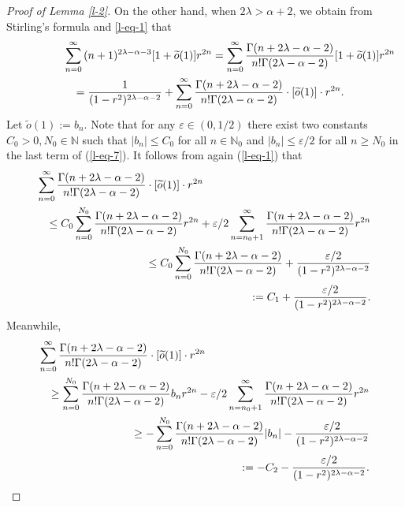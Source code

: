 \documentclass[10pt]{amsart}
\theoremstyle{definition}    %
\numberwithin{equation}{section}
\begin{document}
\begin{proof}[Proof of Lemma \ref{l-2}]
On the other hand, when $2\lambda>\alpha+2$, we obtain from Stirling's formula and \ref{l-eq-1} that 
  \begin{eqnarray}\label{l-eq-7}
 \lefteqn{\sum_{n=0}^{\infty}{(n+1)^{2\lambda-\alpha-3}}[1+\widetilde{o}(1)]r^{2n}=\sum_{n=0}^{\infty}\frac{\Gamma(n+2\lambda-\alpha-2)}{n!\Gamma(2\lambda-\alpha-2)}[1+\widetilde{o}(1)]r^{2n}}\nonumber \\
 &&=\frac{1}{{(1-r^2)^{2\lambda-\alpha-2}}}+\sum_{n=0}^{\infty}\frac{\Gamma(n+2\lambda-\alpha-2)}{n!\Gamma(2\lambda-\alpha-2)}\cdot [\widetilde{o}(1)]\cdot r^{2n}. 
 \end{eqnarray}
Let $\widetilde{o}(1):=b_n$. Note that for any $\varepsilon\in (0,1/2)$ there exist two constants $C_0>0, N_0\in \mathbb{N}$ such that $|b_n|\leq C_0$ for all $n\in \mathbb{N}_0$ and $|b_n|\leq \varepsilon/2$ for all $n\geq N_0$ in the last term of (\ref{l-eq-7}). 
It follows from again  (\ref{l-eq-1}) that
\begin{eqnarray}\label{l-eq-8}
\lefteqn{\sum_{n=0}^{\infty}\frac{\Gamma(n+2\lambda-\alpha-2)}{n!\Gamma(2\lambda-\alpha-2)}\cdot [\widetilde{o}(1)]\cdot r^{2n}} \nonumber \\
  && \leq C_0\sum_{n=0}^{N_0} \frac{\Gamma(n+2\lambda-\alpha-2)}{n!\Gamma(2\lambda-\alpha-2)}r^{2n}+\varepsilon/2\sum_{n={{n_0}+1}}^{\infty}\frac{\Gamma(n+2\lambda-\alpha-2)}{n!\Gamma(2\lambda-\alpha-2)}r^{2n} \nonumber \\
  && \leq C_0\sum_{n=0}^{N_0} \frac{\Gamma(n+2\lambda-\alpha-2)}{n!\Gamma(2\lambda-\alpha-2)}+\frac{\varepsilon/2}{{(1-r^2)^{2\lambda-\alpha-2}}}\nonumber \\
  &&:=C_1+\frac{\varepsilon/2}{{(1-r^2)^{2\lambda-\alpha-2}}}.
  \end{eqnarray}
Meanwhile, \begin{eqnarray}\label{l-eq-9}
\lefteqn{\sum_{n=0}^{\infty}\frac{\Gamma(n+2\lambda-\alpha-2)}{n!\Gamma(2\lambda-\alpha-2)}\cdot [\widetilde{o}(1)]\cdot r^{2n}} \nonumber \\
  && \geq \sum_{n=0}^{N_0} \frac{\Gamma(n+2\lambda-\alpha-2)}{n!\Gamma(2\lambda-\alpha-2)}b_n r^{2n}-\varepsilon/2\sum_{n={{n_0}+1}}^{\infty}\frac{\Gamma(n+2\lambda-\alpha-2)}{n!\Gamma(2\lambda-\alpha-2)}r^{2n} \nonumber \\
  && \geq -\sum_{n=0}^{N_0} \frac{\Gamma(n+2\lambda-\alpha-2)}{n!\Gamma(2\lambda-\alpha-2)}|b_n|-\frac{\varepsilon/2}{{(1-r^2)^{2\lambda-\alpha-2}}}\nonumber \\
  &&:=-C_2-\frac{\varepsilon/2}{{(1-r^2)^{2\lambda-\alpha-2}}}.
  \end{eqnarray}

\end{proof}
\end{document}
